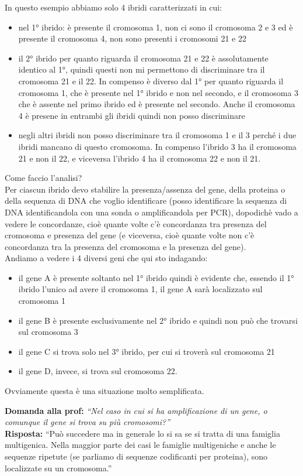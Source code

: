 \documentclass[11pt]{book}
\begin{document}
In questo esempio abbiamo solo 4 ibridi caratterizzati in cui:
\begin{itemize}
\item nel 1° ibrido: è presente il cromosoma 1, non ci sono il cromosoma 2 e 3 ed è presente il cromosoma 4, non sono presenti i cromosomi 21 e 22
\item il 2° ibrido per quanto riguarda il cromosoma 21 e 22 è assolutamente identico al 1°, quindi questi non mi permettono di discriminare tra il cromosoma 21 e il 22. In compenso è diverso dal 1° per quanto riguarda il cromosoma 1, che è presente nel 1° ibrido e non nel secondo, e il cromosoma 3 che è assente nel primo ibrido ed è presente nel secondo. Anche il cromosoma 4 è presene in entrambi gli ibridi quindi non posso discriminare
\item negli altri ibridi non posso discriminare tra il cromosoma 1 e il 3 perché i due ibridi mancano di questo cromosoma. In compenso l’ibrido 3 ha il cromosoma 21 e non il 22, e viceversa l’ibrido 4 ha il cromosoma 22 e non il 21.
\end{itemize}

Come faccio l’analisi?\\
Per ciascun ibrido devo stabilire la presenza/assenza del gene, della proteina o della sequenza di DNA che voglio identificare (posso identificare la sequenza di DNA identificandola con una sonda o amplificandola per PCR), dopodichè vado a vedere le concordanze, cioè quante volte c’è concordanza tra presenza del cromosoma e presenza del gene (e viceversa, cioè quante volte non c’è concordanza tra la presenza del cromosoma e la presenza del gene).\\
Andiamo a vedere i 4 diversi geni che qui sto indagando:
\begin{itemize}
\item il gene A è presente soltanto nel 1° ibrido quindi è evidente che, essendo il 1° ibrido l’unico ad avere il cromosoma 1, il gene A sarà localizzato sul cromosoma 1
\item il gene B è presente esclusivamente nel 2° ibrido e quindi non può che trovarsi sul cromosoma 3
\item il gene C si trova solo nel 3° ibrido, per cui si troverà sul cromosoma 21
\item il gene D, invece, si trova sul cromosoma 22. 
    \end{itemize}

Ovviamente questa è una situazione molto semplificata.

\textbf{Domanda alla prof:} \emph{``Nel caso in cui si ha amplificazione di un gene, o comunque il gene si trova su più cromosomi?''}\\
\textbf{Risposta:} ``Può succedere ma in generale lo si sa se si tratta di una famiglia multigenica. Nella maggior parte dei casi le famiglie multigeniche e anche le sequenze ripetute (se parliamo di sequenze codificanti per proteina), sono localizzate su un cromosoma.''
\end{document}
